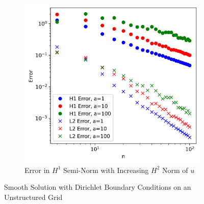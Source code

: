 \documentclass[11pt,a4paper]{article}
\begin{document}
\begin{figure}
\begin{subfigure}{.8\textwidth}
    \centering
    \includegraphics[width=.9\linewidth]{errors_smooth_unstructured}
    \caption{Error in $H^1$ Semi-Norm with Increasing $H^2$ Norm of $u$}
  \end{subfigure}
  \label{fig:smooth_dirichlet_h1_err}
  \caption{Smooth Solution with Dirichlet Boundary Conditions on an Unstructured Grid}
\end{figure}
\end{document}
